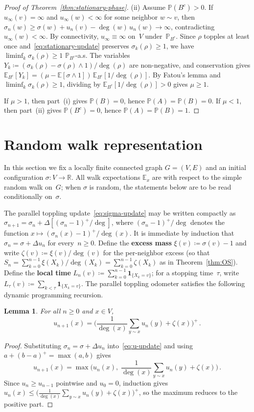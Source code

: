 \documentclass[11pt]{amsart}
\theoremstyle{plain}
\newtheorem{lemma}[theorem]{Lemma}
\theoremstyle{definition}
\newcommand{\R}{\mathbb{R}}
\newcommand{\E}{\mathbb{E}}
\renewcommand{\P}{\mathbb{P}}
\newcommand{\one}{\mathbf{1}}
\begin{document}
\begin{proof}[Proof of Theorem~\ref{thm:stationary-phase}]
		\medskip
		\textup{(ii)}\;
		Assume $\P(B^c)>0$. If $u_\infty(v)=\infty$ and $u_\infty(w)<\infty$ for some neighbor $w\sim v$, then $\sigma_n(w)\geq\sigma(w)+u_n(v)-\deg(w)\,u_n(w)\to\infty$, contradicting $u_\infty(w)<\infty$. By connectivity, $u_\infty\equiv\infty$ on~$V$ under~$\P_{B^c}$. Since $\rho$ topples at least once and~\eqref{eq:stationary-update} preserves $\sigma_k(\rho)\geq 1$, we have $\liminf_k\sigma_k(\rho)\geq 1$ $\P_{B^c}$-a.s. The variables $Y_k\coloneqq(\sigma_k(\rho)-\sigma(\rho)\wedge 1)/\deg(\rho)$ are non-negative, and conservation gives $\E_{B^c}[Y_k]=(\mu-\E[\sigma\wedge 1])\,\E_{B^c}[1/\deg(\rho)]$. By Fatou's lemma and $\liminf_k\sigma_k(\rho)\geq 1$, dividing by $\E_{B^c}[1/\deg(\rho)]>0$ gives $\mu\geq 1$.
		
		\medskip
		If $\mu>1$, then part~(i) gives $\P(B)=0$, hence $\P(A)=\P(B)=0$. If $\mu<1$, then part~(ii) gives $\P(B^c)=0$, hence $\P(A)=\P(B)=1$.
	\end{proof}
	
	\section{Random walk representation}\label{sec:rw-rep}
	In this section we fix a locally finite connected graph $G=(V,E)$ and an initial configuration $\sigma\colon V\to\R$. All walk expectations $\E_x$ are with respect to the simple random walk on~$G$; when $\sigma$ is random, the statements below are to be read conditionally on~$\sigma$.
	
	The parallel toppling update~\eqref{eq:sigma-update} may be written compactly as $\sigma_{n+1} = \sigma_n + \Delta[(\sigma_n - 1)^+/\deg]$, where $(\sigma_n - 1)^+/\deg$ denotes the function $x \mapsto (\sigma_n(x) - 1)^+/\deg(x)$. It is immediate by induction that $\sigma_n = \sigma + \Delta u_n$ for every~$n \geq 0$.
	Define the \textbf{excess mass} $\xi(v)\coloneqq\sigma(v)-1$ and write $\zeta(v)\coloneqq\xi(v)/\deg(v)$ for the per-neighbor excess (so that $S_n=\sum_{k=0}^{n-1}\xi(X_k)/\deg(X_k)=\sum_{k=0}^{n-1}\zeta(X_k)$ as in Theorem~\ref{thm:OS}). Define the \textbf{local time} $L_n(v)\coloneqq\sum_{k=0}^{n-1}\one_{\{X_k=v\}}$; for a stopping time~$\tau$, write $L_\tau(v)\coloneqq\sum_{k<\tau}\one_{\{X_k=v\}}$.
	The parallel toppling odometer satisfies the following dynamic programming recursion.
	\begin{lemma}\label{lem:recursion}
		For all $n \geq 0$ and $x \in V$,
		\[
		u_{n+1}(x) = \biggl(\frac{1}{\deg(x)}\sum_{y \sim x} u_n(y) + \zeta(x)\biggr)^+\,.
		\]
	\end{lemma}
	\begin{proof}
		Substituting $\sigma_n = \sigma + \Delta u_n$ into~\eqref{eq:u-update} and using $a + (b - a)^+ = \max(a, b)$ gives
		\[
		u_{n+1}(x) = \max\biggl(u_n(x),\; \frac{1}{\deg(x)}\sum_{y \sim x} u_n(y) + \zeta(x)\biggr)\,.
		\]
		Since $u_n \geq u_{n-1}$ pointwise and $u_0 = 0$, induction gives $u_n(x) \leq \bigl(\frac{1}{\deg(x)}\sum_{y \sim x} u_n(y) + \zeta(x)\bigr)^+$, so the maximum reduces to the positive part.
	\end{proof}
	
\end{document}
